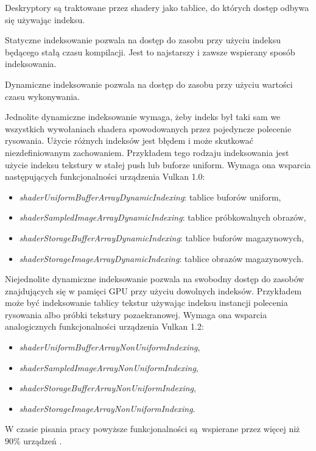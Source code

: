 Deskryptory są traktowane przez shadery jako tablice, do których dostęp odbywa się używając indeksu.

Statyczne indeksowanie pozwala na dostęp do zasobu przy użyciu indeksu będącego stałą czasu kompilacji. Jest to najstarszy i zawsze wspierany sposób indeksowania.

Dynamiczne indeksowanie pozwala na dostęp do zasobu przy użyciu wartości czasu wykonywania.

Jednolite dynamiczne indeksowanie wymaga, żeby indeks był taki sam we wszystkich wywołaniach shadera spowodowanych przez pojedyncze polecenie rysowania. Użycie różnych indeksów jest błędem i może skutkować niezdefiniowanym zachowaniem.
Przykładem tego rodzaju indeksowania jest użycie indeksu tekstury w stałej push lub buforze uniform.
Wymaga ona wsparcia następujących funkcjonalności urządzenia Vulkan 1.0:
\begin{itemize}
	\item {\textit{shaderUniformBufferArrayDynamicIndexing}}: tablice buforów uniform,
	\item {\textit{shaderSampledImageArrayDynamicIndexing}}: tablice próbkowalnych obrazów,
	\item {\textit{shaderStorageBufferArrayDynamicIndexing}}: tablice buforów magazynowych,
	\item {\textit{shaderStorageImageArrayDynamicIndexing}}: tablice obrazów magazynowych.
\end{itemize}

Niejednolite dynamiczne indeksowanie pozwala na swobodny dostęp do zasobów znajdujących się w pamięci GPU przy użyciu dowolnych indeksów.
Przykładem może być indeksowanie tablicy tekstur używając indeksu instancji polecenia rysowania albo próbki tekstury pozaekranowej.
Wymaga ona wsparcia analogicznych funkcjonalności urządzenia Vulkan 1.2:
\begin{itemize}
	\item {\textit{shaderUniformBufferArrayNonUniformIndexing}},
	\item {\textit{shaderSampledImageArrayNonUniformIndexing}},
	\item {\textit{shaderStorageBufferArrayNonUniformIndexing}},
	\item {\textit{shaderStorageImageArrayNonUniformIndexing}}.
\end{itemize}

W czasie pisania pracy powyższe funkcjonalności są wspierane przez więcej niż $90\%$ urządzeń \cite{GPUINFO}.

